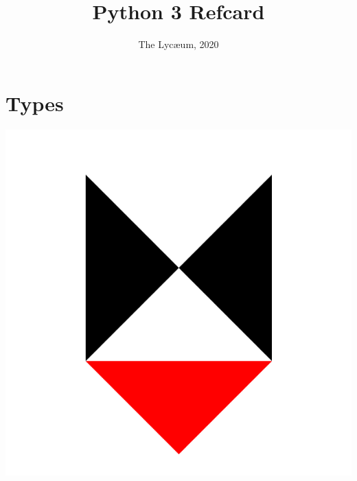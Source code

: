 \documentclass{../refsheet}
\title{Python 3 Refcard}
\author{The Lyc\ae{}um, 2020}
\date{}
\begin{document}
\maketitle
\section{Types}







\begin{center}
\includegraphics[scale=0.02]{../images/lycaeum-logo.png}
\end{center}
\end{document}
